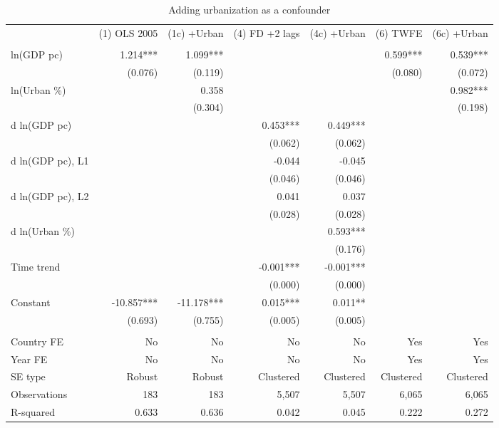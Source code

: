 \begin{table}[h]
\centering
\caption{Adding urbanization as a confounder}
\begin{tabular}{lrrrrrr}
\toprule
 & (1) OLS 2005 & (1c) +Urban & (4) FD +2 lags & (4c) +Urban & (6) TWFE & (6c) +Urban \\
 &  &  &  &  &  &  \\
\midrule
ln(GDP pc) & 1.214*** & 1.099*** &  &  & 0.599*** & 0.539*** \\
 & (0.076) & (0.119) &  &  & (0.080) & (0.072) \\
ln(Urban \%) &  & 0.358 &  &  &  & 0.982*** \\
 &  & (0.304) &  &  &  & (0.198) \\
d ln(GDP pc) &  &  & 0.453*** & 0.449*** &  &  \\
 &  &  & (0.062) & (0.062) &  &  \\
d ln(GDP pc), L1 &  &  & -0.044 & -0.045 &  &  \\
 &  &  & (0.046) & (0.046) &  &  \\
d ln(GDP pc), L2 &  &  & 0.041 & 0.037 &  &  \\
 &  &  & (0.028) & (0.028) &  &  \\
d ln(Urban \%) &  &  &  & 0.593*** &  &  \\
 &  &  &  & (0.176) &  &  \\
Time trend &  &  & -0.001*** & -0.001*** &  &  \\
 &  &  & (0.000) & (0.000) &  &  \\
Constant & -10.857*** & -11.178*** & 0.015*** & 0.011** &  &  \\
 & (0.693) & (0.755) & (0.005) & (0.005) &  &  \\
 &  &  &  &  &  &  \\
Country FE & No & No & No & No & Yes & Yes \\
Year FE & No & No & No & No & Yes & Yes \\
SE type & Robust & Robust & Clustered & Clustered & Clustered & Clustered \\
Observations & 183 & 183 & 5,507 & 5,507 & 6,065 & 6,065 \\
R-squared & 0.633 & 0.636 & 0.042 & 0.045 & 0.222 & 0.272 \\
\bottomrule
\end{tabular}
\end{table}
